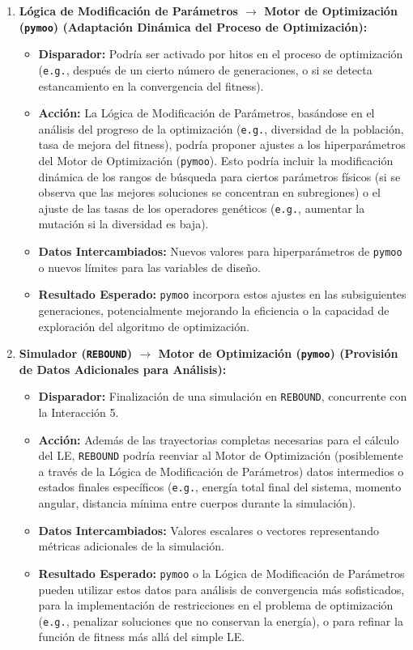 \begin{enumerate}
    \item \textbf{Lógica de Modificación de Parámetros $\rightarrow$ Motor de Optimización (\texttt{pymoo}) (Adaptación Dinámica del Proceso de Optimización):}
    \begin{itemize}
        \item \textbf{Disparador:} Podría ser activado por hitos en el proceso de optimización (\texttt{e.g.}, después de un cierto número de generaciones, o si se detecta estancamiento en la convergencia del fitness).
        \item \textbf{Acción:} La Lógica de Modificación de Parámetros, basándose en el análisis del progreso de la optimización (\texttt{e.g.}, diversidad de la población, tasa de mejora del fitness), podría proponer ajustes a los hiperparámetros del Motor de Optimización (\texttt{pymoo}). Esto podría incluir la modificación dinámica de los rangos de búsqueda para ciertos parámetros físicos (si se observa que las mejores soluciones se concentran en subregiones) o el ajuste de las tasas de los operadores genéticos (\texttt{e.g.}, aumentar la mutación si la diversidad es baja).
        \item \textbf{Datos Intercambiados:} Nuevos valores para hiperparámetros de \texttt{pymoo} o nuevos límites para las variables de diseño.
        \item \textbf{Resultado Esperado:} \texttt{pymoo} incorpora estos ajustes en las subsiguientes generaciones, potencialmente mejorando la eficiencia o la capacidad de exploración del algoritmo de optimización.
    \end{itemize}

    \item \textbf{Simulador (\texttt{REBOUND}) $\rightarrow$ Motor de Optimización (\texttt{pymoo}) (Provisión de Datos Adicionales para Análisis):}
    \begin{itemize}
        \item \textbf{Disparador:} Finalización de una simulación en \texttt{REBOUND}, concurrente con la Interacción 5.
        \item \textbf{Acción:} Además de las trayectorias completas necesarias para el cálculo del LE, \texttt{REBOUND} podría reenviar al Motor de Optimización (posiblemente a través de la Lógica de Modificación de Parámetros) datos intermedios o estados finales específicos (\texttt{e.g.}, energía total final del sistema, momento angular, distancia mínima entre cuerpos durante la simulación).
        \item \textbf{Datos Intercambiados:} Valores escalares o vectores representando métricas adicionales de la simulación.
        \item \textbf{Resultado Esperado:} \texttt{pymoo} o la Lógica de Modificación de Parámetros pueden utilizar estos datos para análisis de convergencia más sofisticados, para la implementación de restricciones en el problema de optimización (\texttt{e.g.}, penalizar soluciones que no conservan la energía), o para refinar la función de fitness más allá del simple LE.\
    \end{itemize}


\end{enumerate}
